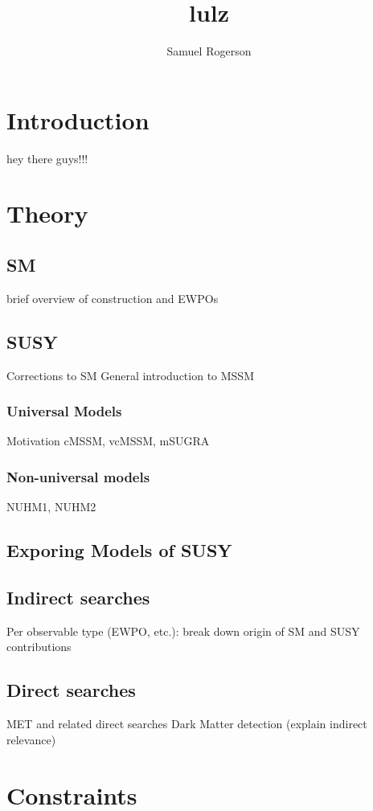 \documentclass{hepthesis}
\begin{document}
\linenumbers %
\title{lulz}
\author{Samuel Rogerson}
   
\begin{frontmatter} 
\end{frontmatter}
  
\begin{mainmatter}
    \clearpage
    \section{Introduction}
    hey there guys!!!
    \section{Theory}
        \subsection{SM}
        brief overview of construction and EWPOs
        \subsection{SUSY}
        Corrections to SM
        General introduction to MSSM
            \subsubsection{Universal Models}
            Motivation
            cMSSM, vcMSSM, mSUGRA
            \subsubsection{Non-universal models}
            NUHM1, NUHM2
    \subsection{Exporing Models of SUSY}
        \subsection{Indirect searches}
        Per observable type (EWPO, etc.): break down origin of SM and SUSY contributions
        \subsection{Direct searches}
        MET and related direct searches
        Dark Matter detection (explain indirect relevance)
    \section{}

    \section{Constraints}
    \section{}

\end{mainmatter}
    
%

\begin{backmatter}
\end{backmatter}
\end{document}
